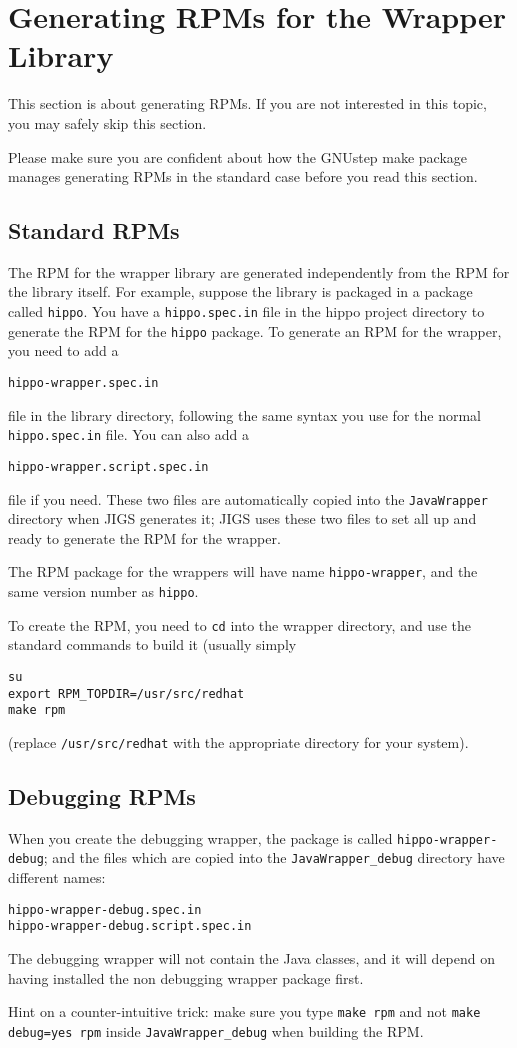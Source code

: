 \section{Generating RPMs for the Wrapper Library}

This section is about generating RPMs.  If you are not interested in
this topic, you may safely skip this section.

Please make sure you are confident about how the GNUstep make package
manages generating RPMs in the standard case before you read this
section.

\subsection{Standard RPMs}

The RPM for the wrapper library are generated independently from the
RPM for the library itself.  For example, suppose the library is
packaged in a package called \texttt{hippo}.  You have a
\texttt{hippo.spec.in} file in the hippo project directory to generate 
the RPM for the \texttt{hippo} package.  To generate an RPM for the 
wrapper, you need to add a 
\begin{verbatim} 
hippo-wrapper.spec.in
\end{verbatim}
file in the library directory, following the same syntax you use for the 
normal \texttt{hippo.spec.in} file.  You can also add a 
\begin{verbatim}
hippo-wrapper.script.spec.in
\end{verbatim}
file if you need.  These two files are automatically copied into the
\texttt{JavaWrapper} directory when JIGS generates it; JIGS uses these two 
files to set all up and ready to generate the RPM for the wrapper.

The RPM package for the wrappers will have name
\texttt{hippo-wrapper}, and the same version number as \texttt{hippo}.

To create the RPM, you need to \texttt{cd} into the wrapper directory,
and use the standard commands to build it (usually simply
\begin{verbatim}
su
export RPM_TOPDIR=/usr/src/redhat
make rpm
\end{verbatim}
(replace \texttt{/usr/src/redhat} with the appropriate directory for
your system).

\subsection{Debugging RPMs}

When you create the debugging wrapper, the package is called
\texttt{hippo-wrapper-debug}; and the files which are copied into the
\texttt{JavaWrapper\_debug} directory have different names:
\begin{verbatim}
hippo-wrapper-debug.spec.in
hippo-wrapper-debug.script.spec.in
\end{verbatim}

The debugging wrapper will not contain the Java classes, and it will
depend on having installed the non debugging wrapper package first.

Hint on a counter-intuitive trick: make sure you type \texttt{make
rpm} and not \texttt{make debug=yes rpm} inside
\texttt{JavaWrapper\_debug} when building the RPM.
